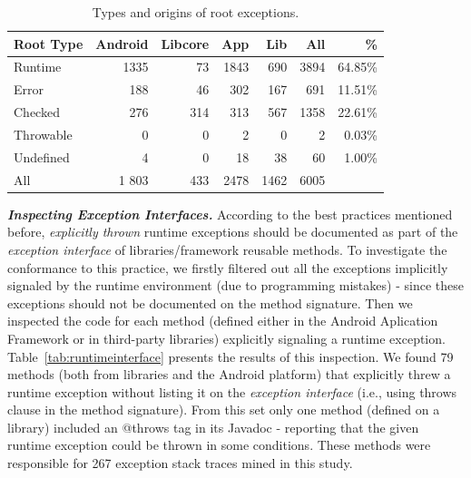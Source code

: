 
\begin{table}
\scriptsize
\centering
\begin{tabular}{lrrrrrr}
    \hline
    \bfseries{Root Type} & \bfseries{Android} & \bfseries{Libcore} & \bfseries{App} & \bfseries{Lib}  & \bfseries{All} & \bfseries{\%} \\
    \hline

Runtime	&	1335	&	73	&	1843	&	690  &	3894 & 64.85\% \\  %
Error	       &	 188              &	 46	&	302             &	167	           &	691 & 11.51\%	\\
Checked	&	276           &	314	&	313          &	567	           &	1358 & 22.61\%	\\
Throwable	&	0	       &	0	&	2            &	0         &	2 & 0.03\%	\\
Undefined	&	4	&	0	&	18		&	38	   &	60	& 1.00\% \\
 \hline
All		& 1  803	&	433	&	2478	&	1462	&	6005 	\\
    \hline
  \end{tabular}
\caption{Types and origins of root exceptions.}
  \label{tab:typeroottab}
\end{table}

\bigskip


\bigskip

\emph{\textbf{Inspecting Exception Interfaces.}}  According to the best practices mentioned before, 
 \emph{explicitly thrown} runtime exceptions 
should be documented as part of the \emph{exception interface} of libraries/framework reusable
methods. To investigate the conformance to this practice, we firstly filtered out all the exceptions implicitly
 signaled by  the runtime environment (due to programming mistakes) - since these exceptions 
should not be documented on the method signature.  Then we inspected
the code for each method 
(defined either in the Android  Aplication Framework or in third-party libraries) 
explicitly signaling a runtime exception. 
Table~\ref{tab:runtimeinterface} presents the results of this inspection. 
We found 79 methods (both from libraries and the Android platform) that  explicitly threw a runtime exception 
without listing it on the \emph{exception interface} (i.e., using 
throws clause in the method signature). From this set only one method (defined on a library)
included an @throws tag in its Javadoc - reporting that the given runtime exception
could be thrown in some conditions. These methods were responsible for 
267 exception stack traces mined in this study.

